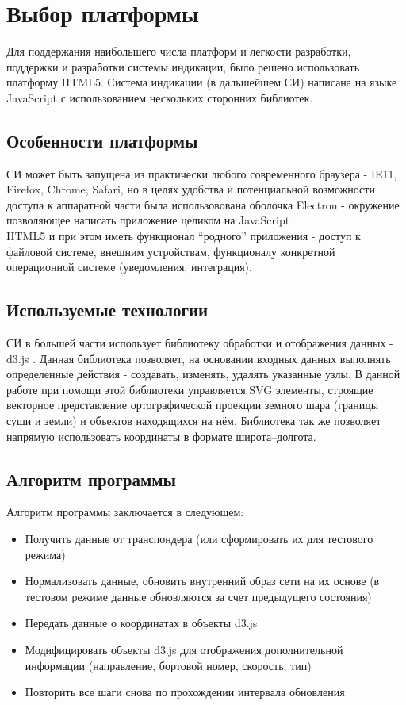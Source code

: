 \documentclass[a4paper,12pt]{report} %
\begin{document}
\section{Выбор платформы}

Для поддержания наибольшего числа платформ и легкости разработки, поддержки и
разработки системы индикации, было решено использовать платформу HTML5. Система
индикации (в дальшейшем СИ) написана на языке JavaScript с использованием
нескольких сторонних библиотек.

\subsection{Особенности платформы}

СИ может быть запущена из практически любого современного браузера - IE11,
Firefox, Chrome, Safari, но в целях удобства и потенциальной возможности доступа
к аппаратной части была использовована оболочка Electron\cite{electron} - окружение позволяющее
написать приложение целиком на JavaScript\\HTML5 и при этом иметь функционал
``родного'' приложения - доступ к файловой системе, внешним устройствам,
функционалу конкретной операционной системе (уведомления, интеграция).

\subsection{Используемые технологии}

СИ в большей части использует библиотеку обработки и отображения данных - d3.js \cite{d3js}.
Данная библиотека позволяет, на основании входных данных выполнять определенные
действия - создавать, изменять, удалять указанные узлы. В данной работе при
помощи этой библиотеки управляется SVG элементы, строящие векторное
представление ортографической проекции земного шара (границы суши и земли) и
объектов находящихся на нём. Библиотека так же позволяет напрямую использовать
координаты в формате широта--долгота.

\subsection{Алгоритм программы}

Алгоритм программы заключается в следующем:
\begin{itemize}
\item Получить данные от транспондера (или сформировать их для тестового режима)
\item Нормализовать данные, обновить внутренний образ сети на их основе (в
  тестовом режиме данные обновляются за счет предыдущего состояния)
\item Передать данные о координатах в объекты d3.js
\item Модифицировать объекты d3.js для отображения дополнительной информации
  (направление, бортовой номер, скорость, тип)
\item Повторить все шаги снова по прохождении интервала обновления
\end{itemize}
\newpage
\end{document}
